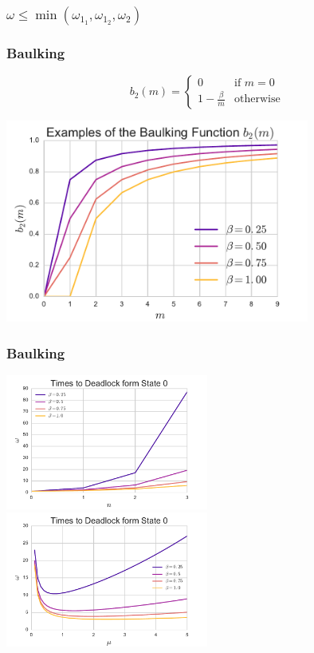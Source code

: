 \documentclass[xcolor={table}]{beamer}
\begin{document}
\begin{frame}
  \frametitle{$\omega \leq \min(\omega_{1_1}, \omega_{1_2}, \omega_2)$}
  \begin{center}
  
  
  
  \end{center}
\end{frame}

\begin{frame}
\frametitle{Baulking}
\begin{equation*}
b_2(m) = \left\{ \begin{array}{rr}
0 & \text{if } m = 0\\
1 - \frac{\beta}{m} & \text{otherwise}
\end{array} \right.
\end{equation*}
\begin{center}
\includegraphics[width=0.75\textwidth]{../images/examplebaulking2.pdf}
\end{center}
\end{frame}

\begin{frame}
\frametitle{Baulking}
\includegraphics[width=0.5\textwidth]{../images/varyn_bybeta.pdf}
\includegraphics[width=0.5\textwidth]{../images/varymu_bybeta.pdf}
\end{frame}
\end{document}
